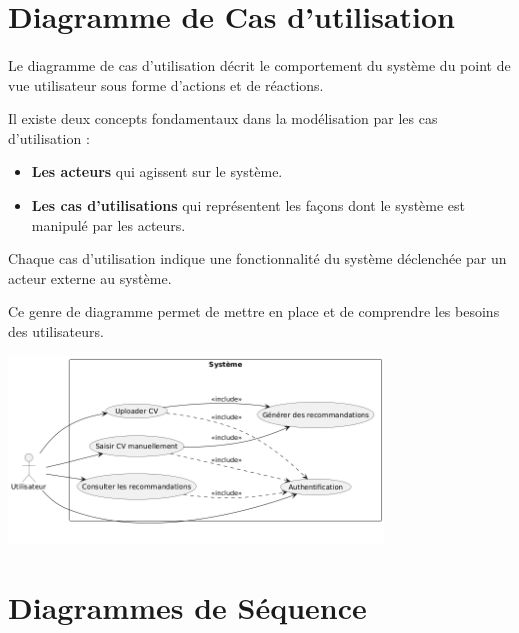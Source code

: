 \section{Diagramme de Cas d’utilisation}
\paragraph{}\begin{spacing}{1}
Le diagramme de cas d’utilisation décrit le comportement du système du point de vue utilisateur sous forme d’actions et de réactions.

Il existe deux concepts fondamentaux dans la modélisation par les cas d’utilisation :
\begin{itemize}
    \item \textbf{Les acteurs} qui agissent sur le système.
    \item \textbf{Les cas d’utilisations} qui représentent les façons dont le système est manipulé par les acteurs.
\end{itemize}

Chaque cas d’utilisation indique une fonctionnalité du système déclenchée par un acteur externe au système.

Ce genre de diagramme permet de mettre en place et de comprendre les besoins des utilisateurs.
\end{spacing}
\includegraphics[width=\linewidth, height=5cm]{images/diagramme cas utilisation.png}


\section{Diagrammes de Séquence}
